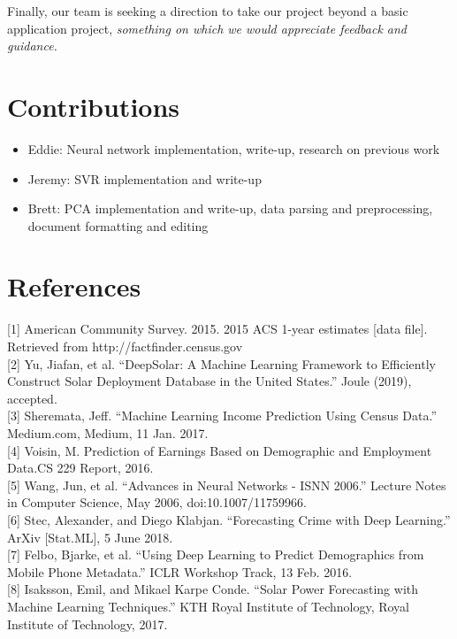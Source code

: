 \documentclass{article}
\begin{document}
	Finally, our team is seeking a direction to take our project beyond a basic application project, \textit{something on which we would appreciate feedback and guidance.}
	
	\section*{Contributions}
		\begin{itemize}[noitemsep,nolistsep]
			\item Eddie: Neural network implementation, write-up, research on previous work
			\item Jeremy: SVR implementation and write-up
			\item Brett: PCA implementation and write-up, data parsing and preprocessing, document formatting and editing
		\end{itemize}
	
	\section*{References}
	\smallskip
	\scriptsize
	\setlength{\parindent}{0in}
	[1] American Community Survey. 2015.  2015 ACS 1-year estimates [data file]. Retrieved from http://factfinder.census.gov\\ [0.5pt]
	
	[2] Yu, Jiafan, et al. “DeepSolar: A Machine Learning Framework to Efficiently Construct Solar Deployment Database in the United States.” Joule (2019), accepted.\\ [0.5pt]
	
	[3] Sheremata, Jeff. “Machine Learning Income Prediction Using Census Data.” Medium.com, Medium, 11 Jan. 2017.\\ [0.5pt]
	
	[4] Voisin, M. Prediction of Earnings Based on Demographic and Employment Data.CS 229 Report, 2016.\\ [0.5pt]
	
	[5] Wang, Jun, et al. “Advances in Neural Networks - ISNN 2006.” Lecture Notes in Computer Science, May 2006, doi:10.1007/11759966.\\ [0.5pt]
	
	[6] Stec, Alexander, and Diego Klabjan. “Forecasting Crime with Deep Learning.” ArXiv [Stat.ML], 5 June 2018.\\ [0.5pt]
	
	[7] Felbo, Bjarke, et al. “Using Deep Learning to Predict Demographics from Mobile Phone Metadata.” ICLR Workshop Track, 13 Feb. 2016.\\ [0.5pt]
	
	[8] Isaksson, Emil, and Mikael Karpe Conde. “Solar Power Forecasting with Machine Learning Techniques.” KTH Royal Institute of Technology, Royal Institute of Technology, 2017.\\ [0.5pt]
\end{document}

